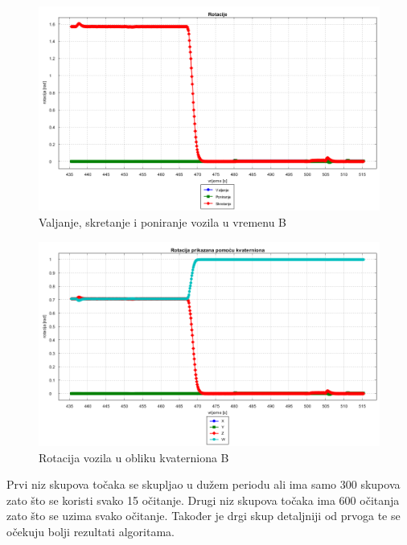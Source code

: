 \begin{figure}[H]
  \includegraphics[scale=0.35]{images/rotacija_vrijeme2.png}
  \caption{Valjanje, skretanje i poniranje vozila u vremenu B}
  \label{fig:gt2_rot_vr}
\end{figure}
\begin{figure}[H]
  \includegraphics[scale=0.35]{images/rotacija_kvaterni2.png}
  \caption{Rotacija vozila u obliku kvaterniona B}
  \label{fig:gt2_rot_kv}
\end{figure}
Prvi niz skupova točaka se skupljao u dužem periodu ali ima samo 300 skupova zato što se koristi svako 15 očitanje. Drugi niz skupova točaka ima 600 očitanja zato što se uzima svako očitanje. Također je drgi skup detaljniji od prvoga te se očekuju bolji rezultati algoritama.